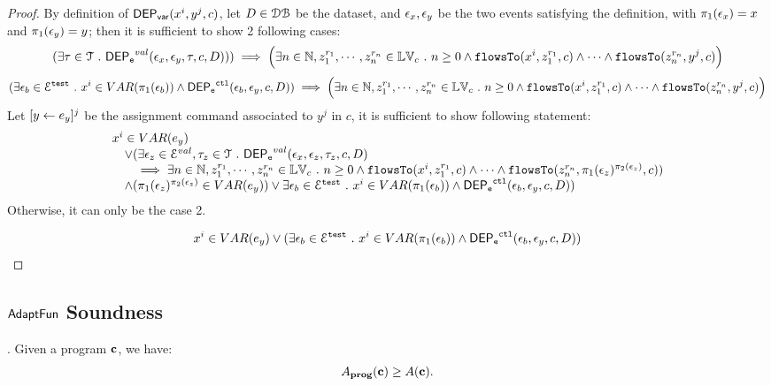 \begin{proof}
    By definition of $\mathsf{DEP_{var}}(x^i, y^j, {c})$, let $D \in \mathcal{DB}$ be the dataset,
and $\mathtt{\epsilon}_x, \mathtt{\epsilon}_y$ be the two events satisfying the definition, 
with $\pi_1(\mathtt{\epsilon}_x) = x$ and $\pi_1(\mathtt{\epsilon}_y) = y$;
then it is sufficient to show 2 following cases:
    \[
        (\exists \mathtt{\tau} \in \mathcal{T} ~.~ 
        \mathsf{DEP_{\mathtt{e}}}^{val}(\mathtt{\epsilon}_x, \mathtt{\epsilon}_y, \mathtt{\tau}, c, D)) )
        \implies
  \Big( \exists n \in \mathbb{N}, z_1^{r_1}, \cdots, z_n^{r_n} \in \mathbb{LV}_{{c}} ~.~ n \geq 0 \land
  \mathtt{flowsTo}(x^i,  z_1^{r_1}, c) 
  \land \cdots \land \mathtt{flowsTo}(z_n^{r_n}, y^j, c) \Big)
    \]
    \[
        (\exists \mathtt{\epsilon}_b \in \mathcal{E}^{\mathtt{{test}}} ~.~ x^i \in VAR(\pi_1(\mathtt{\epsilon}_b)) 
        \land \mathsf{DEP_{\mathtt{e}}}^{\mathtt{{ctl}}}(\mathtt{\epsilon}_b, \mathtt{\epsilon}_y, c, D))    
    \implies
  \Big( \exists n \in \mathbb{N}, z_1^{r_1}, \cdots, z_n^{r_n} \in \mathbb{LV}_{{c}} ~.~ n \geq 0 \land
  \mathtt{flowsTo}(x^i,  z_1^{r_1}, c) 
  \land \cdots \land \mathtt{flowsTo}(z_n^{r_n}, y^j, c) \Big)
\]
Let $[\mathrel{ y \leftarrow e_y }]^j$ be the assignment command associated to $y^j$ in $c$,
it is sufficient to show following statement:
    $$
    \begin{array}{l}
    x^i \in VAR(e_y)
    \\ \quad 
    \lor 
    (\exists \mathtt{\epsilon}_z \in \mathcal{E}^{val}, \mathtt{\tau}_z \in \mathcal{T} ~.~ 
        \mathsf{DEP_{\mathtt{e}}}^{val}(\mathtt{\epsilon}_x, \mathtt{\epsilon}_z, \mathtt{\tau}_z, c, D)
        \\ \qquad 
        \implies 
        \exists n \in \mathbb{N}, z_1^{r_1}, \cdots, z_n^{r_n} \in \mathbb{LV}_{{c}} ~.~ n \geq 0 \land
  \mathtt{flowsTo}(x^i,  z_1^{r_1}, c) 
  \land \cdots \land \mathtt{flowsTo}(z_n^{r_n},  \pi_1(\mathtt{\epsilon}_z)^{\pi_2(\mathtt{\epsilon}_z)}, c)
        )
        \\ \quad
        \land 
   ( \pi_1(\mathtt{\epsilon}_z)^{\pi_2(\mathtt{\epsilon}_z)} \in VAR(e_y)) 
    \lor  \exists \mathtt{\epsilon}_b \in \mathcal{E}^{\mathtt{{test}}} ~.~ x^i \in VAR(\pi_1(\mathtt{\epsilon}_b)) 
    \land \mathsf{DEP_{\mathtt{e}}}^{\mathtt{{ctl}}}(\mathtt{\epsilon}_b, \mathtt{\epsilon}_y, c, D))
    \end{array}
    $$
Otherwise, it can only be the case 2.

    $$
    x^i \in VAR(e_y)
    \lor 
    (\exists \mathtt{\epsilon}_b \in \mathcal{E}^{\mathtt{{test}}} ~.~ x^i \in VAR(\pi_1(\mathtt{\epsilon}_b)) 
    \land \mathsf{DEP_{\mathtt{e}}}^{\mathtt{{ctl}}}(\mathtt{\epsilon}_b, \mathtt{\epsilon}_y, c, D))
    $$

\end{proof}

\subsection{$\textsf{AdaptFun}$ Soundness}
{
  \begin{thm}.
  Given a program ${\boldsymbol{\mathbf{c}}}$, we have:
  \[
  A_{\bf{prog}}({\boldsymbol{\mathbf{c}}}) \geq A({\boldsymbol{\mathbf{c}}}).
  \]
  \end{thm}
}

